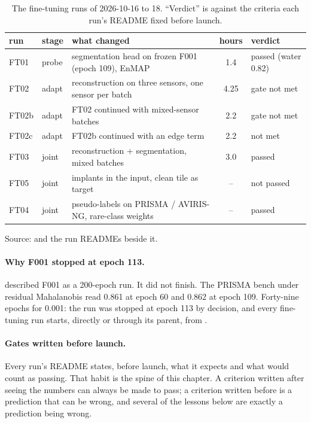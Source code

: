 \begin{table}[htbp]
\centering
\caption{The fine-tuning runs of 2026-10-16 to 18. ``Verdict'' is against the criteria each run's README fixed
before launch.}
\label{tab:ftruns:runs}
\small
\begin{tabular}{llp{5.0cm}cl}
\toprule
run & stage & what changed & hours & verdict \\
\midrule
FT01 & probe & segmentation head on frozen F001 (epoch 109), EnMAP & 1.4 & passed (water 0.82) \\
FT02 & adapt & reconstruction on three sensors, one sensor per batch & 4.25 & gate not met \\
FT02b & adapt & FT02 continued with mixed-sensor batches & 2.2 & gate not met \\
FT02c & adapt & FT02b continued with an edge term & 2.2 & not met \\
FT03 & joint & reconstruction + segmentation, mixed batches & 3.0 & passed \\
FT05 & joint & implants in the input, clean tile as target & -- & not passed \\
FT04 & joint & pseudo-labels on PRISMA / AVIRIS-NG, rare-class weights & -- & passed \\
\bottomrule
\end{tabular}

\smallskip
{\footnotesize Source:  and the run READMEs beside it.}
\end{table}

\paragraph{Why F001 stopped at epoch 113.}  described F001 as a 200-epoch run. It did not
finish. The PRISMA bench under residual Mahalanobis read 0.861 at epoch 60 and 0.862 at epoch
109. Forty-nine epochs for 0.001:
the run was stopped at epoch 113 by decision, and every fine-tuning run starts, directly or through its parent,
from .

\paragraph{Gates written before launch.}  Every run's README states, before launch, what
it expects and what would count as passing. That habit is the spine of this chapter. A criterion written after
seeing the numbers can always be made to pass; a criterion written before is a prediction that can be wrong, and
several of the lessons below are exactly a prediction being wrong.


